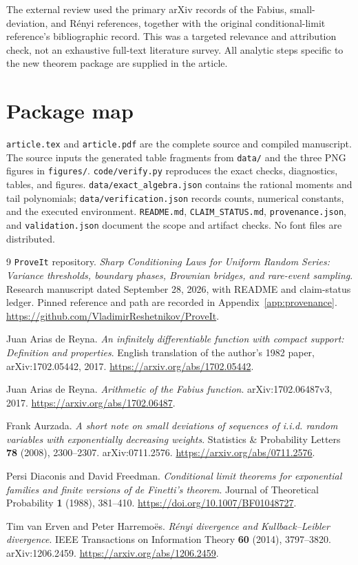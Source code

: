 \documentclass[11pt,oneside]{article}
\numberwithin{equation}{section}
\theoremstyle{plain}
\theoremstyle{definition}
\theoremstyle{remark}
\newcommand{\repo}{\texttt{ProveIt}}
\begin{document}
The external review used the primary arXiv records of the Fabius,
small-deviation, and R\'enyi references, together with the original
conditional-limit reference's bibliographic record. This was a
targeted relevance and attribution check, not an exhaustive
full-text literature survey. All analytic steps specific to the
new theorem package are supplied in the article.

\section{Package map}
\label{app:package}
\noindent
\texttt{article.tex} and \texttt{article.pdf} are the complete source and
compiled manuscript. The source inputs the generated table fragments
from \texttt{data/} and the three PNG figures in \texttt{figures/}.
\texttt{code/verify.py} reproduces the exact checks, diagnostics,
tables, and figures. \texttt{data/exact\_algebra.json} contains the
rational moments and tail polynomials; \texttt{data/verification.json}
records counts, numerical constants, and the executed environment.
\texttt{README.md}, \texttt{CLAIM\_STATUS.md},
\texttt{provenance.json}, and \texttt{validation.json} document the
scope and artifact checks. No font files are distributed.

\begin{thebibliography}{9}
\repo{} repository.
\emph{Sharp Conditioning Laws for Uniform Random Series:
Variance thresholds, boundary phases, Brownian bridges, and rare-event
sampling}. Research manuscript dated September 28, 2026, with README
and claim-status ledger. Pinned reference and path are recorded in
Appendix~\ref{app:provenance}.
\url{https://github.com/VladimirReshetnikov/ProveIt}.

Juan Arias de Reyna.
\emph{An infinitely differentiable function with compact support:
Definition and properties}. English translation of the author's
1982 paper, arXiv:1702.05442, 2017.
\url{https://arxiv.org/abs/1702.05442}.

Juan Arias de Reyna.
\emph{Arithmetic of the Fabius function}. arXiv:1702.06487v3, 2017.
\url{https://arxiv.org/abs/1702.06487}.

Frank Aurzada.
\emph{A short note on small deviations of sequences of i.i.d. random
variables with exponentially decreasing weights}.
Statistics \& Probability Letters \textbf{78} (2008), 2300--2307.
arXiv:0711.2576.
\url{https://arxiv.org/abs/0711.2576}.

Persi Diaconis and David Freedman.
\emph{Conditional limit theorems for exponential families and finite
versions of de Finetti's theorem}.
Journal of Theoretical Probability \textbf{1} (1988), 381--410.
\url{https://doi.org/10.1007/BF01048727}.

Tim van Erven and Peter Harremo\"es.
\emph{R\'enyi divergence and Kullback--Leibler divergence}.
IEEE Transactions on Information Theory \textbf{60} (2014), 3797--3820.
arXiv:1206.2459.
\url{https://arxiv.org/abs/1206.2459}.
\end{thebibliography}
\end{document}
